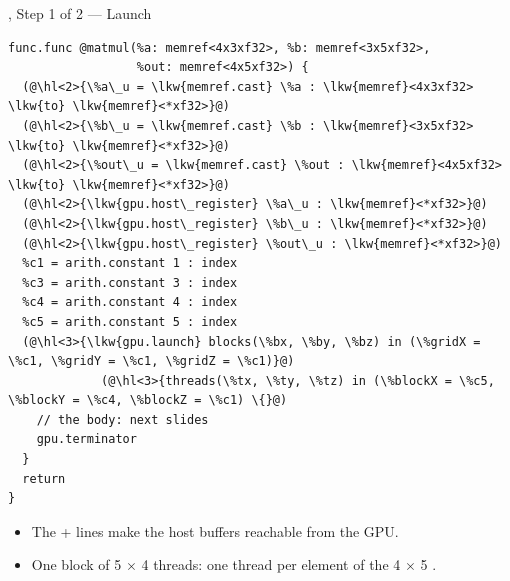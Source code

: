 \documentclass[aspectratio=169,10pt]{beamer}
\begin{document}
\begin{frame}[fragile]{, Step 1 of 2 --- Launch}
\begin{lstlisting}[language=mlir]
func.func @matmul(%a: memref<4x3xf32>, %b: memref<3x5xf32>,
                  %out: memref<4x5xf32>) {
  (@\hl<2>{\%a\_u = \lkw{memref.cast} \%a : \lkw{memref}<4x3xf32> \lkw{to} \lkw{memref}<*xf32>}@)
  (@\hl<2>{\%b\_u = \lkw{memref.cast} \%b : \lkw{memref}<3x5xf32> \lkw{to} \lkw{memref}<*xf32>}@)
  (@\hl<2>{\%out\_u = \lkw{memref.cast} \%out : \lkw{memref}<4x5xf32> \lkw{to} \lkw{memref}<*xf32>}@)
  (@\hl<2>{\lkw{gpu.host\_register} \%a\_u : \lkw{memref}<*xf32>}@)
  (@\hl<2>{\lkw{gpu.host\_register} \%b\_u : \lkw{memref}<*xf32>}@)
  (@\hl<2>{\lkw{gpu.host\_register} \%out\_u : \lkw{memref}<*xf32>}@)
  %c1 = arith.constant 1 : index
  %c3 = arith.constant 3 : index
  %c4 = arith.constant 4 : index
  %c5 = arith.constant 5 : index
  (@\hl<3>{\lkw{gpu.launch} blocks(\%bx, \%by, \%bz) in (\%gridX = \%c1, \%gridY = \%c1, \%gridZ = \%c1)}@)
             (@\hl<3>{threads(\%tx, \%ty, \%tz) in (\%blockX = \%c5, \%blockY = \%c4, \%blockZ = \%c1) \{}@)
    // the body: next slides
    gpu.terminator
  }
  return
}
\end{lstlisting}
  \vspace{0.2em}
  \begin{itemize}
    \item<2-> The  +  lines make the
      host buffers reachable from the GPU.
    \item<3-> One block of 5 $\times$ 4 threads: one thread per element of the
      4 $\times$ 5 .
  \end{itemize}
\end{frame}
\end{document}
